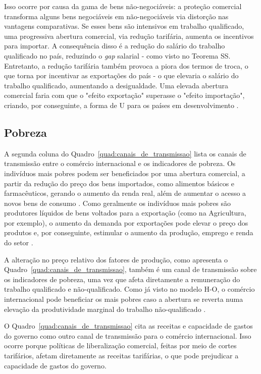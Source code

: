 Isso ocorre por causa da gama de bens não-negociáveis: a proteção comercial transforma alguns bens negociáveis em não-negociáveis via distorção nas vantagens comparativas. Se esses bens são intensivos em trabalho qualificado, uma progressiva abertura comercial, via redução tarifária, aumenta os incentivos para importar. A consequência disso é a redução do salário do trabalho qualificado no país, reduzindo o \textit{gap} salarial - como visto no Teorema SS. Entretanto, a redução tarifária também provoca a piora dos termos de troca, o que torna por incentivar as exportações do país - o que elevaria o salário do trabalho qualificado, aumentando a desigualdade. Uma elevada abertura comercial faria com que o "efeito exportação" superasse o "efeito importação", criando, por conseguinte, a forma de U para os países em desenvolvimento \cite{goldbergpavcnik04}.


\subsection{Pobreza} \label{subsec:pobreza}

A segunda coluna do Quadro~\ref{quad:canais_de_transmissao} lista os canais de transmissão entre o comércio internacional e os indicadores de pobreza. Os indivíduos mais pobres podem ser beneficiados por uma abertura comercial, a partir da redução do preço dos bens importados, como alimentos básicos e farmacêuticos, gerando o aumento da renda real, além de aumentar o acesso a novos bens de consumo \cite{bannisterthugge01}. Como geralmente os indivíduos mais pobres são produtores líquidos de bens voltados para a exportação (como na Agricultura, por exemplo), o aumento da demanda por exportações pode elevar o preço dos produtos e, por conseguinte, estimular o aumento da produção, emprego e renda do setor \cite{bannisterthugge01}.

A alteração no preço relativo dos fatores de produção, como apresenta o Quadro~\ref{quad:canais_de_transmissao}, também é um canal de transmissão sobre os indicadores de pobreza, uma vez que afeta diretamente a remuneração do trabalho qualificado e não-qualificado. Como já visto no modelo H-O, o comércio internacional pode beneficiar os mais pobres caso a abertura se reverta numa elevação da produtividade marginal do trabalho não-qualificado \cite{bannisterthugge01}.

O Quadro~\ref{quad:canais_de_transmissao} cita as receitas e capacidade de gastos do governo como outro canal de transmissão para o comércio internacional. Isso ocorre porque políticas de liberalização comercial, feitas por meio de cortes tarifários, afetam diretamente as receitas tarifárias, o que pode prejudicar a capacidade de gastos do governo.

